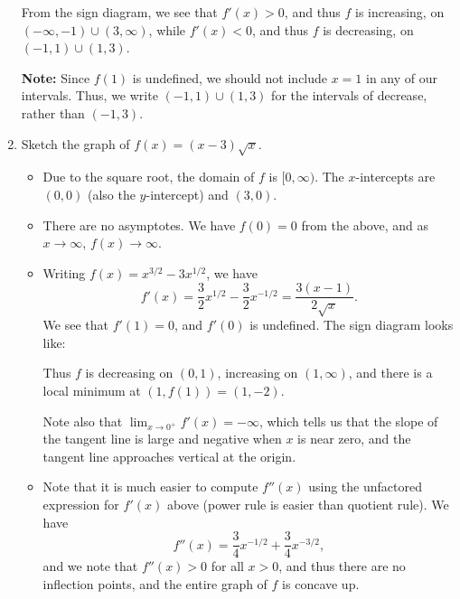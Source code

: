 \documentclass[12pt]{article}
\newcommand{\di}{\displaystyle}
\begin{document}
\begin{enumerate}
From the sign diagram, we see that $f'(x)>0$, and thus $f$ is increasing, on $(-\infty,-1)\cup (3,\infty)$, while $f'(x)<0$, and thus $f$ is decreasing, on $(-1,1)\cup (1,3)$.

\textbf{Note:} Since $f(1)$ is undefined, we should not include $x=1$ in any of our intervals. Thus, we write $(-1,1)\cup (1,3)$ for the intervals of decrease, rather than $(-1,3)$.

\newpage

\item Sketch the graph of $f(x) = (x-3)\sqrt{x}$. 

\begin{itemize}
\item Due to the square root, the domain of $f$ is $[0,\infty)$. The $x$-intercepts are $(0,0)$ (also the $y$-intercept) and $(3,0)$.

\item There are no asymptotes. We have $f(0)=0$ from the above, and as $x\to \infty$, $f(x)\to\infty$.

\item Writing $f(x) = x^{3/2}-3x^{1/2}$, we have
\[
f'(x) = \frac32 x^{1/2}-\frac32 x^{-1/2} = \frac{3(x-1)}{2\sqrt{x}}.
\]
We see that $f'(1)=0$, and $f'(0)$ is undefined. The sign diagram looks like:
\begin{center}
\end{center}
Thus $f$ is decreasing on $(0,1)$, increasing on $(1,\infty)$, and there is a local minimum at $(1,f(1))=(1,-2)$.

Note also that $\di \lim_{x\to 0^+}f'(x) = -\infty$, which tells us that the slope of the tangent line is large and negative when $x$ is near zero, and the tangent line approaches vertical at the origin.

\item Note that it is much easier to compute $f''(x)$ using the unfactored expression for $f'(x)$ above (power rule is easier than quotient rule). We have
\[
f''(x) = \frac34 x^{-1/2}+\frac34 x^{-3/2},
\]
and we note that $f''(x)>0$ for all $x>0$, and thus there are no inflection points, and the entire graph of $f$ is concave up.


\end{itemize}
\end{enumerate}
\end{document}
